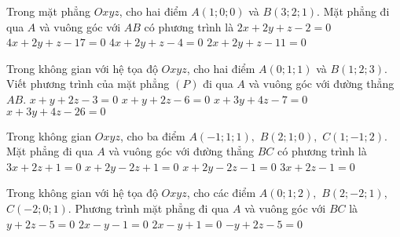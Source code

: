 \begin{ex}%
	Trong mặt phẳng $O x y z$, cho hai điểm $A(1 ; 0 ; 0)$ và $B(3 ; 2 ; 1)$. Mặt phẳng đi qua $A$ và vuông góc với $A B$ có phương trình là
	\choice
	{\True $2 x+2 y+z-2=0$}
	{$4 x+2 y+z-17=0$}
	{$4 x+2 y+z-4=0$}
	{$2 x+2 y+z-11=0$}
\end{ex}
\begin{ex}%
	Trong không gian với hệ tọa độ $Oxyz$, cho hai điểm $A(0 ; 1 ; 1)$  và $B(1 ; 2 ; 3)$. Viết phương trình của mặt phẳng $(P)$ đi qua $A$ và vuông góc với đường thẳng $A B$.
	\choice
	{\True $x+y+2 z-3=0$}
	{$x+y+2z-6=0$}
	{$x+3y+4z-7=0$}
	{$x+3y+4z-26=0$}
\end{ex}

\begin{ex}%
	Trong không gian $O x y z$, cho ba điểm $A(-1 ; 1 ; 1),$ $ B(2 ; 1 ; 0),$ $ C(1 ;-1 ; 2)$. Mặt phẳng đi qua $A$ và vuông góc với đường thẳng $B C$ có phương trình là
	\choice
	{$3 x+2 z+1=0$}
	{\True $x+2 y-2 z+1=0$}
	{$x+2 y-2 z-1=0$}
	{$3 x+2 z-1=0$}
\end{ex}
\begin{ex}%
	Trong không gian với hệ tọa độ $O x y z$, cho các điểm $A(0 ; 1 ; 2), $ $B(2 ;-2 ; 1)$, $C(-2 ; 0 ; 1)$. Phương trình mặt phẳng đi qua $A$ và vuông góc với $B C$ là
	\choice
	{$y+2 z-5=0$}
	{$2 x-y-1=0$}
	{\True $2 x-y+1=0$}
	{$-y+2 z-5=0$}
\end{ex}

